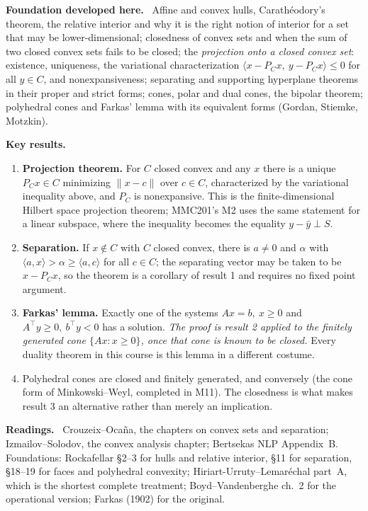 \documentclass[11pt,a4paper]{article}
\newcommand{\mpart}[1]{\smallskip\noindent\textbf{#1}\ \ignorespaces}
\begin{document}
\mpart{Foundation developed here.} Affine and convex hulls, Carath\'eodory's theorem, the
relative interior and why it is the right notion of interior for a set that may be
lower-dimensional; closedness of convex sets and when the sum of two closed convex sets fails
to be closed; the \emph{projection onto a closed convex set}: existence, uniqueness, the
variational characterization $\langle x - P_C x,\ y - P_C x\rangle \le 0$ for all $y \in C$,
and nonexpansiveness; separating and supporting hyperplane theorems in their proper and
strict forms; cones, polar and dual cones, the bipolar theorem; polyhedral cones and Farkas'
lemma with its equivalent forms (Gordan, Stiemke, Motzkin).

\mpart{Key results.}
\begin{enumerate}
\item \textbf{Projection theorem.} For $C$ closed convex and any $x$ there is a unique
$P_C x \in C$ minimizing $\|x - c\|$ over $c \in C$, characterized by the variational
inequality above, and $P_C$ is nonexpansive. This is the finite-dimensional Hilbert space
projection theorem; MMC201's M2 uses the same statement for a linear subspace, where the
inequality becomes the equality $y - \hat y \perp S$.
\item \textbf{Separation.} If $x \notin C$ with $C$ closed convex, there is $a \ne 0$ and
$\alpha$ with $\langle a, x\rangle > \alpha \ge \langle a, c\rangle$ for all $c \in C$; the
separating vector may be taken to be $x - P_C x$, so the theorem is a corollary of result 1
and requires no fixed point argument.
\item \textbf{Farkas' lemma.} Exactly one of the systems $Ax = b,\ x \ge 0$ and
$A^\top y \ge 0,\ b^\top y < 0$ has a solution. \emph{The proof is result 2 applied to the
finitely generated cone $\{Ax : x \ge 0\}$, once that cone is known to be closed.} Every
duality theorem in this course is this lemma in a different costume.
\item Polyhedral cones are closed and finitely generated, and conversely (the cone form of
Minkowski--Weyl, completed in M11). The closedness is what makes result 3 an alternative
rather than merely an implication.
\end{enumerate}

\mpart{Readings.} Crouzeix--Oca\~na, the chapters on convex sets and separation;
Izmailov--Solodov, the convex analysis chapter; Bertsekas NLP Appendix~B. Foundations:
Rockafellar \S 2--3 for hulls and relative interior, \S 11 for separation, \S 18--19 for
faces and polyhedral convexity; Hiriart-Urruty--Lemar\'echal part~A, which is the shortest
complete treatment; Boyd--Vandenberghe ch.~2 for the operational version; Farkas (1902) for
the original.
\end{document}
